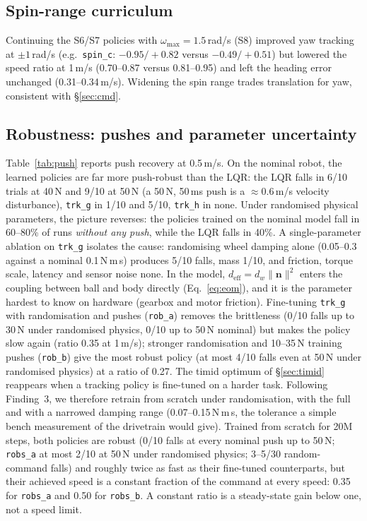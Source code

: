 \documentclass[conference]{IEEEtran}
\theoremstyle{remark}
\begin{document}
\subsection{Spin-range curriculum}
Continuing the S6/S7 policies with $\omega_{\max}=1.5$\,rad/s (S8) improved yaw tracking at $\pm1$\,rad/s (e.g.\ \texttt{spin\_c}: $-0.95/+0.82$ versus $-0.49/+0.51$) but lowered the speed ratio at 1\,m/s (0.70--0.87 versus 0.81--0.95) and left the heading error unchanged (0.31--0.34\,m/s). Widening the spin range trades translation for yaw, consistent with \S\ref{sec:cmd}.

\subsection{Robustness: pushes and parameter uncertainty}
Table~\ref{tab:push} reports push recovery at 0.5\,m/s. On the nominal robot, the learned policies are far more push-robust than the LQR: the LQR falls in 6/10 trials at 40\,N and 9/10 at 50\,N (a 50\,N, 50\,ms push is a $\approx$0.6\,m/s velocity disturbance), \texttt{trk\_g} in 1/10 and 5/10, \texttt{trk\_h} in none. Under randomised physical parameters, the picture reverses: the policies trained on the nominal model fall in 60--80\% of runs \emph{without any push}, while the LQR falls in 40\%. A single-parameter ablation on \texttt{trk\_g} isolates the cause: randomising wheel damping alone (0.05--0.3 against a nominal 0.1\,N\,m\,s) produces 5/10 falls, mass 1/10, and friction, torque scale, latency and sensor noise none. In the model, $d_{\mathrm{eff}}=d_w\lVert\bm n\rVert^2$ enters the coupling between ball and body directly (Eq.~\eqref{eq:eom}), and it is the parameter hardest to know on hardware (gearbox and motor friction). Fine-tuning \texttt{trk\_g} with randomisation and pushes (\texttt{rob\_a}) removes the brittleness (0/10 falls up to 30\,N under randomised physics, 0/10 up to 50\,N nominal) but makes the policy slow again (ratio 0.35 at 1\,m/s); stronger randomisation and 10--35\,N training pushes (\texttt{rob\_b}) give the most robust policy (at most 4/10 falls even at 50\,N under randomised physics) at a ratio of 0.27. The timid optimum of \S\ref{sec:timid} reappears when a tracking policy is fine-tuned on a harder task. Following Finding~3, we therefore retrain from scratch under randomisation, with the full and with a narrowed damping range (0.07--0.15\,N\,m\,s, the tolerance a simple bench measurement of the drivetrain would give). Trained from scratch for 20M steps, both policies are robust (0/10 falls at every nominal push up to 50\,N; \texttt{robs\_a} at most 2/10 at 50\,N under randomised physics; 3--5/30 random-command falls) and roughly twice as fast as their fine-tuned counterparts, but their achieved speed is a constant fraction of the command at every speed: 0.35 for \texttt{robs\_a} and 0.50 for \texttt{robs\_b}. A constant ratio is a steady-state gain below one, not a speed limit.
\end{document}
